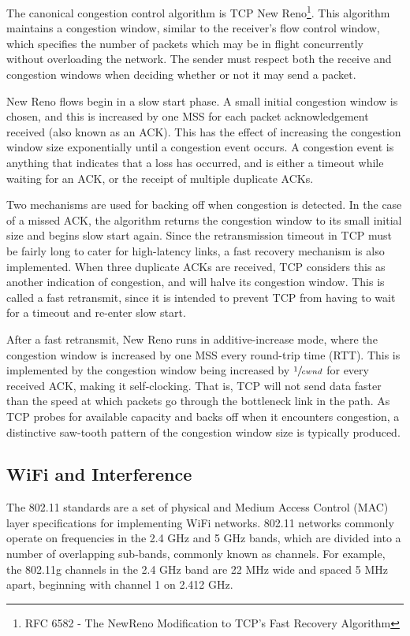 The canonical congestion control algorithm is TCP New Reno\footnote{RFC 6582 -
The NewReno Modification to TCP's Fast Recovery Algorithm}. This algorithm
maintains a congestion window, similar to the receiver's flow control window,
which specifies the number of packets which may be in flight concurrently
without overloading the network. The sender must respect both the receive and
congestion windows when deciding whether or not it may send a packet.

New Reno flows begin in a slow start phase. A small initial congestion window is
chosen, and this is increased by one MSS for each packet acknowledgement
received (also known as an ACK). This has the effect of increasing the
congestion window size exponentially until a congestion event occurs. A
congestion event is anything that indicates that a loss has occurred, and is
either a timeout while waiting for an ACK, or the receipt of multiple duplicate
ACKs.

Two mechanisms are used for backing off when congestion is detected. In the case
of a missed ACK, the algorithm returns the congestion window to its small
initial size and begins slow start again. Since the retransmission timeout in
TCP must be fairly long to cater for high-latency links, a fast recovery
mechanism is also implemented. When three duplicate ACKs are received, TCP
considers this as another indication of congestion, and will halve its
congestion window. This is called a fast retransmit, since it is intended to
prevent TCP from having to wait for a timeout and re-enter slow start.

After a fast retransmit, New Reno runs in additive-increase mode, where the
congestion window is increased by one MSS every round-trip time (RTT). This is
implemented by the congestion window being increased by $\sfrac{1}{cwnd}$ for
every received ACK, making it self-clocking. That is, TCP will not send data
faster than the speed at which packets go through the bottleneck link in the
path. As TCP probes for available capacity and backs off when it encounters
congestion, a distinctive saw-tooth pattern of the congestion window size is
typically produced.

\subsection{WiFi and Interference}
\label{sec:bg:wifi}
The 802.11 standards are a set of physical and Medium Access Control (MAC) layer
specifications for implementing WiFi networks. 802.11 networks commonly operate
on frequencies in the 2.4 GHz and 5 GHz bands, which are divided into a number
of overlapping sub-bands, commonly known as channels. For example, the 802.11g
channels in the 2.4 GHz band are 22 MHz wide and spaced 5 MHz apart, beginning
with channel 1 on 2.412 GHz.

